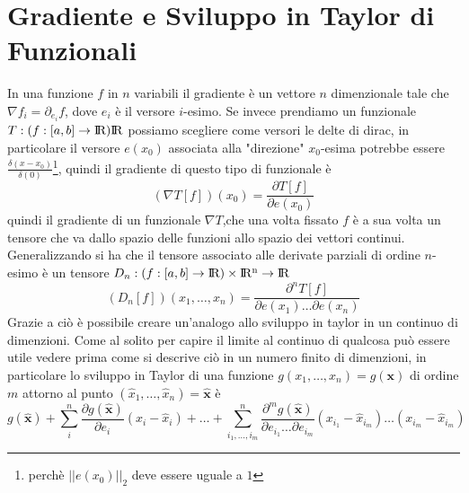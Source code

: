 \documentclass[11pt,a4paper]{article}
\theoremstyle{definition}
\theoremstyle{plain}
\theoremstyle{plain}
\begin{document}
	\section{Gradiente e Sviluppo in Taylor di Funzionali}
		In una funzione $f$ in $n$ variabili il gradiente è un vettore $n$ dimenzionale tale che $\nabla f_i=\partial_{e_i} f$, dove $e_i$ è il versore $i$-esimo.\newline
		Se invece prendiamo un funzionale $T:(f:[a,b]\rightarrow \rm I\!R) \rm I\!R$ possiamo scegliere come versori le delte di dirac, in particolare il versore $e(x_0)$ associata alla "direzione" $x_0$-esima potrebbe essere $\frac{\delta (x-x_0)}{\delta(0)}$\footnote{perchè $||e(x_0)||_2$ deve essere uguale a $1$}, quindi il gradiente di questo tipo di funzionale è
		\begin{equation}
			(\nabla T[f])(x_0)=\frac{\partial T[f]}{\partial e(x_0)}
		\end{equation}
		quindi  il gradiente di un funzionale $\nabla T$,che una volta fissato $f$ è a sua volta un tensore che va dallo spazio delle funzioni allo spazio dei vettori continui.\newline
		Generalizzando si ha che il tensore associato alle derivate parziali di ordine $n$-esimo è un tensore $D_n:(f:[a,b]\rightarrow \rm I\!R)\times \rm I\!R^n\rightarrow \rm I\!R$
		\begin{equation}
			(D_n[f])(x_1,\dots,x_n)=\frac{\partial^n T[f]}{\partial e(x_1)\dots\partial e(x_n)}
		\end{equation}
		Grazie a ciò è possibile creare un'analogo allo sviluppo in taylor in un continuo di dimenzioni.\newline
		Come al solito per capire il limite al continuo di qualcosa può essere utile vedere prima come si descrive ciò in un numero finito di dimenzioni, in particolare lo sviluppo in Taylor di una funzione $g(x_1,\dots,x_n)=g(\mathbf x)$ di ordine $m$ attorno al punto $(\hat x_1,\dots,\hat x_n)=\mathbf{\hat x}$ è
		\begin{equation}
			g(\mathbf{\hat x})+\sum_{i}^{n}\frac{\partial g(\mathbf{\hat x})}{\partial e_i}(x_i-\hat x_i)+\dots+
			\sum_{i_1,\dots,i_m}^{n}
			\frac{\partial^m g(\mathbf{\hat x})}
			{\partial e_{i_1}\dots\partial e_{i_m}}
			(x_{i_1}-\hat x_{i_m})\dots(x_{i_m}-\hat x_{i_m})
		\end{equation}
		
\end{document}
